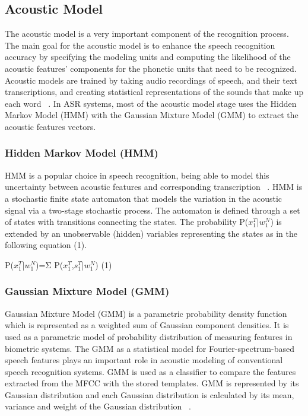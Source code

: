 \documentclass[conference]{IEEEtran}
\newcommand\tab[1][1cm]{\hspace*{#1}}
\begin{document}
\subsection{Acoustic Model}
\label{AcousticModel} 
The acoustic model is a very important component of the recognition process. The main goal for the acoustic model is to enhance the speech recognition accuracy by specifying the modeling units and computing the likelihood of the acoustic features' components for the phonetic units that need to be recognized. Acoustic models are trained by taking audio recordings of speech, and their text transcriptions, and creating statistical representations of the sounds that make up each word ~\cite{stot}. In ASR systems, most of the acoustic model stage uses the Hidden Markov Model (HMM) with the Gaussian Mixture Model (GMM) to extract the acoustic features vectors.

\subsubsection{Hidden Markov Model (HMM)}
\label{HiddenMarkovModel} 
HMM is a popular choice in speech recognition, being able to model this uncertainty between acoustic features and corresponding transcription ~\cite{meKaldi}. HMM is a stochastic finite state automaton that models the variation in the acoustic signal via a two-stage stochastic process. The automaton is defined through a set of states with transitions connecting the states. The probability P($x_1^T$|$w_1^N$) is extended by an unobservable (hidden) variables representing the states as in the following equation (1).

P($x_1^T$|$w_1^N$)=Σ P($x_1^T$,$s_1^T$|$w_1^N$)	 \tab[3cm](1)


\subsubsection{Gaussian Mixture Model (GMM)}
\label{GaussianMixtureModel} 
Gaussian Mixture Model (GMM) is a parametric probability density function which is represented as a
weighted sum of Gaussian component densities. It is used as a parametric model of probability distribution of measuring features in biometric systems. The GMM as a statistical model for Fourier-spectrum-based speech features plays an important role in acoustic modeling of conventional speech recognition systems. GMM is used as a classifier to compare the features extracted from the MFCC with the stored templates. GMM is represented by its Gaussian distribution and each Gaussian distribution is calculated by its mean, variance and weight of the Gaussian distribution ~\cite{gmm}.
\end{document}
